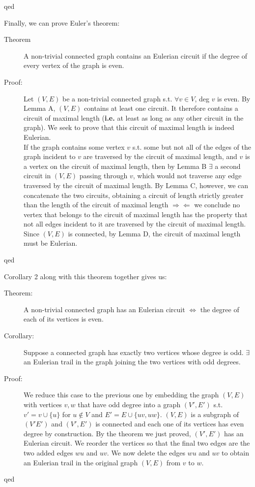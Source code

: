 \documentclass[10pt]{article}
\begin{document}
\begin{description}
		\item[qed]
	\end{description}
	Finally, we can prove Euler's theorem:
	\begin{description}
		\item[Theorem] A non-trivial connected graph contains an Eulerian circuit if the degree of every vertex of the graph is even.
		\item[Proof:] Let $(V, E)$ be a non-trivial connected graph s.t. $\forall v \in V$, deg $v$ is even. By Lemma A, $(V, E)$ contains at least one circuit. It therefore contains a circuit of maximal length (\textbf{i.e.} at least as long as any other circuit in the graph). We seek to prove that this circuit of maximal length is indeed Eulerian. \\
		If the graph contains some vertex $v$ s.t. some but not all of the edges of the graph incident to $v$ are traversed by the circuit of maximal length, and $v$ is a vertex on the circuit of maximal length, then by Lemma B $\exists$ a second circuit in $(V, E)$ passing through $v$, which would not traverse any edge traversed by the circuit of maximal length. By Lemma C, however, we can concatenate the two circuits, obtaining a circuit of length strictly greater than the length of the circuit of maximal length $\Rightarrow \Leftarrow$ we conclude no vertex that belongs to the circuit of maximal length has the property that not all edges incident to it are traversed by the circuit of maximal length. Since $(V, E)$ is connected, by Lemma D, the circuit of maximal length must be Eulerian.
		\item[qed]
	\end{description}
	Corollary 2 along with this theorem together gives us:
	\begin{description}
		\item[Theorem:] A non-trivial connected graph has an Eulerian circuit $\Leftrightarrow$ the degree of each of its vertices is even.
		\item[Corollary:] Suppose a connected graph has exactly two vertices whose degree is odd. $\exists$ an Eulerian trail in the graph joining the two vertices with odd degrees.
		\item[Proof:] We reduce this case to the previous one by embedding the graph $(V, E)$ with vertices $v, w$ that have odd degree into a graph $(V', E')$ s.t. $v' = v \cup \{u\}$ for $u \notin V$ and $E' = E \cup \{uv, uw\}$. $(V, E)$ is a subgraph of $(V' E')$ and $(V', E')$ is connected and each one of its vertices has even degree by construction. By the theorem we just proved, $(V', E')$ has an Eulerian circuit. We reorder the vertices so that the final two edges are the two added edges $wu$ and $uv$. We now delete the edges $wu$ and $uv$ to obtain an Eulerian trail in the original graph $(V, E)$ from $v$ to $w$.
		\item[qed]
	\end{description}
	
\end{document}
